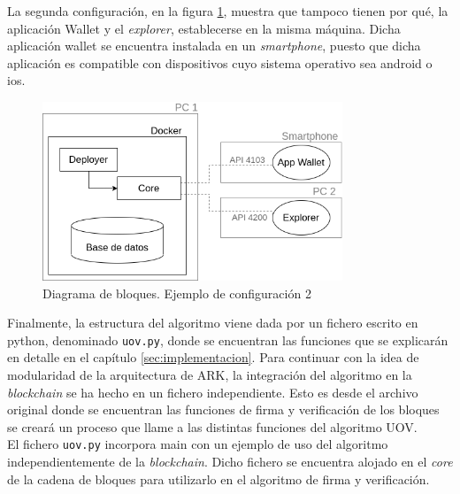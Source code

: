 La segunda configuración, en la figura \ref{fig:diag-bloques-3}, muestra que tampoco tienen por qué, la aplicación Wallet y el \textit{explorer}, establecerse en la misma máquina. Dicha aplicación wallet se encuentra instalada en un \textit{smartphone}, puesto que dicha aplicación es compatible con dispositivos cuyo sistema operativo sea android o \acrshort{ios}.\\

\begin{figure}[H]
	\centering
	\includegraphics[width=0.8\textwidth]{figuras/diagrama_bloquesARK3.png}
	\caption{Diagrama de bloques. Ejemplo de configuración 2}
	\label{fig:diag-bloques-3}
\end{figure}


Finalmente, la estructura del algoritmo viene dada por un fichero escrito en python, denominado \texttt{uov.py}, donde se encuentran las funciones que se explicarán en detalle en el capítulo \ref{sec:implementacion}. Para continuar con la idea de modularidad de la arquitectura de ARK, la integración del algoritmo en la \textit{blockchain} se ha hecho en un fichero independiente. Esto es desde el archivo original donde se encuentran las funciones de firma y verificación de los bloques se creará un proceso que llame a las distintas funciones del algoritmo UOV.\\

El fichero \texttt{uov.py} incorpora main con un ejemplo de uso del algoritmo independientemente de la \textit{blockchain}. Dicho fichero se encuentra alojado en el \textit{core} de la cadena de bloques para utilizarlo en el algoritmo de firma y verificación.\\